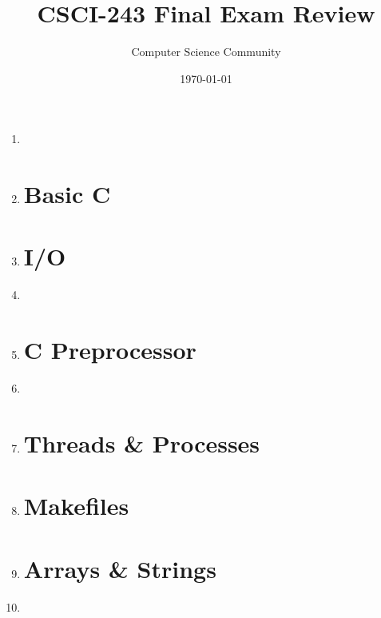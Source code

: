 \documentclass[11pt]{article}
\title{CSCI-243 Final Exam Review}
\author{Computer Science Community}
\date{\today}
\begin{document}
	\header 

	\begin{enumerate}
		\section*{History \& Language Paradigms}
		\item 
		
		\item 

		\newpage
		\section*{Basic C}
		\item 

		\newpage
		\section*{I/O}
		\item 

		\newpage
		\item 
		\vspace{.5in}

		\section*{C Preprocessor}
		\item 

		\newpage
		\item 

		\section*{Threads \& Processes}
		\item 

		\newpage
		\section*{Makefiles}
		\item 

		\newpage
		\section*{Arrays \& Strings}
		\item 


\end{enumerate}
\end{document}
